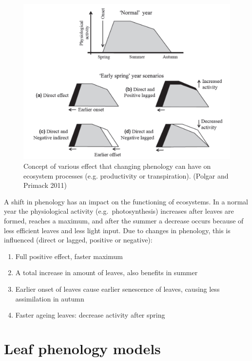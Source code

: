 \documentclass[
  12pt,
  oneside]{book}
\begin{document}
\begin{figure}

{\centering \includegraphics[width=0.8\linewidth]{figures/chap4/f43_Polgar} 

}

\caption{Concept of various effect that changing phenology can have on ecosystem processes (e.g. productivity or transpiration). (Polgar and Primack 2011)}\label{fig:f43}
\end{figure}

A shift in phenology has an impact on the functioning of ecosystems. In a normal year the physiological activity (e.g.~photosynthesis) increases after leaves are formed, reaches a maximum, and after the summer a decrease occurs because of less efficient leaves and less light input. Due to changes in phenology, this is influenced (direct or lagged, positive or negative):

\begin{enumerate}
\def\labelenumi{\Alph{enumi})}
\item
  Full positive effect, faster maximum
\item
  A total increase in amount of leaves, also benefits in summer
\item
  Earlier onset of leaves cause earlier senescence of leaves, causing less assimilation in autumn
\item
  Faster ageing leaves: decrease activity after spring
\end{enumerate}

\hypertarget{leaf-phenology-models}{%
\section{Leaf phenology models}\label{leaf-phenology-models}}
\end{document}
